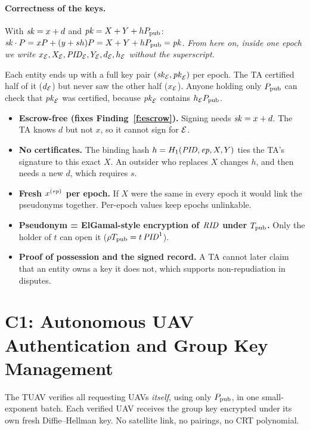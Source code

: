 \paragraph{Correctness of the keys.} With $\mathit{sk}=x+d$ and $\mathit{pk}=X+Y+hP_{\mathrm{pub}}$:\;
$\mathit{sk}\cdot P=xP+(y+sh)P=X+Y+hP_{\mathrm{pub}}=\mathit{pk}$.
\emph{From here on, inside one epoch we write $x_{\mathcal{E}},X_{\mathcal{E}},\mathit{PID}_{\mathcal{E}},Y_{\mathcal{E}},d_{\mathcal{E}},h_{\mathcal{E}}$ without the superscript.}

\begin{whatbox}
Each entity ends up with a full key pair $(\mathit{sk}_{\mathcal{E}},\mathit{pk}_{\mathcal{E}})$ per epoch. The TA certified half of it ($d_{\mathcal{E}}$) but never saw the other half ($x_{\mathcal{E}}$).
Anyone holding only $P_{\mathrm{pub}}$ can check that $\mathit{pk}_{\mathcal{E}}$ was certified, because $\mathit{pk}_{\mathcal{E}}$ contains $h_{\mathcal{E}}P_{\mathrm{pub}}$.
\end{whatbox}
\begin{whybox}
\begin{itemize}[leftmargin=*]
  \item \textbf{Escrow-free (fixes Finding~\ref{f:escrow}).} Signing needs $\mathit{sk}=x+d$. The TA knows $d$ but not $x$, so it cannot sign for $\mathcal{E}$.
  \item \textbf{No certificates.} The binding hash $h=H_1(\mathit{PID},\mathit{ep},X,Y)$ ties the TA's signature to this exact $X$. An outsider who replaces $X$ changes
        $h$, and then needs a new $d$, which requires $s$.
  \item \textbf{Fresh $x^{(\mathit{ep})}$ per epoch.} If $X$ were the same in every epoch it would link the pseudonyms together. Per-epoch values keep epochs unlinkable.
  \item \textbf{Pseudonym = ElGamal-style encryption of $\mathit{RID}$ under $T_{\mathrm{pub}}$.} Only the holder of $t$ can open it ($\rho T_{\mathrm{pub}}=t\,\mathit{PID}^1$).
  \item \textbf{Proof of possession and the signed record.} A TA cannot later claim that an entity owns a key it does not, which supports non-repudiation in disputes.
\end{itemize}
\end{whybox}

\section{C1: Autonomous UAV Authentication and Group Key Management}\label{sec:c1}
\begin{keybox}
The TUAV verifies all requesting UAVs \emph{itself}, using only $P_{\mathrm{pub}}$, in one small-exponent batch. Each verified UAV receives the
group key encrypted under its own fresh Diffie--Hellman key. No satellite link, no pairings, no CRT polynomial.
\end{keybox}

